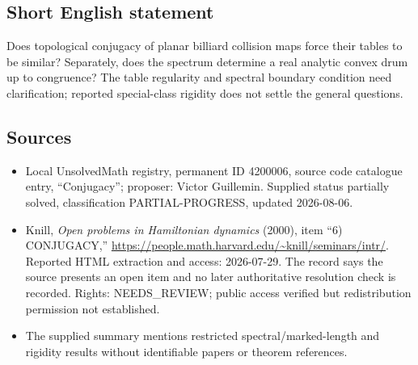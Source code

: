 \documentclass[11pt]{article}
\begin{document}
\subsection{Short English statement}
Does topological conjugacy of planar billiard collision maps force their tables to be similar? Separately, does the spectrum determine a real analytic convex drum up to congruence? The table regularity and spectral boundary condition need clarification; reported special-class rigidity does not settle the general questions.
\subsection{Sources}
\begin{itemize}
\item Local UnsolvedMath registry, permanent ID 4200006, source code catalogue entry, ``Conjugacy''; proposer: Victor Guillemin. Supplied status partially solved, classification PARTIAL-PROGRESS, updated 2026-08-06.
\item Knill, \emph{Open problems in Hamiltonian dynamics} (2000), item ``6) CONJUGACY,'' \url{https://people.math.harvard.edu/~knill/seminars/intr/}. Reported HTML extraction and access: 2026-07-29. The record says the source presents an open item and no later authoritative resolution check is recorded. Rights: NEEDS\_REVIEW; public access verified but redistribution permission not established.
\item The supplied summary mentions restricted spectral/marked-length and rigidity results without identifiable papers or theorem references.
\end{itemize}
\end{document}
